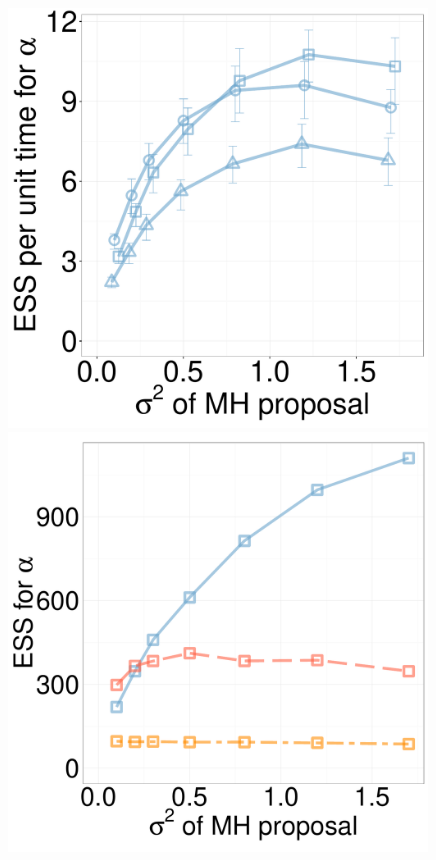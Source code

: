 \begin{figure}
\begin{minipage}[!hp]{0.24\linewidth}
  \end{minipage}
  \begin{minipage}[!hp]{0.24\linewidth}
	\centering
    \includegraphics[width=0.99\textwidth, angle=0]{figs/new_whole_exp_figs/mh_jc_alpha.pdf}
\end{minipage}
  \begin{minipage}[!hp]{0.24\linewidth}
	\centering
    \includegraphics[width=0.99\textwidth, angle=0]{figs/ess/JCalpha_k2.pdf}

\end{minipage}
\end{figure}
